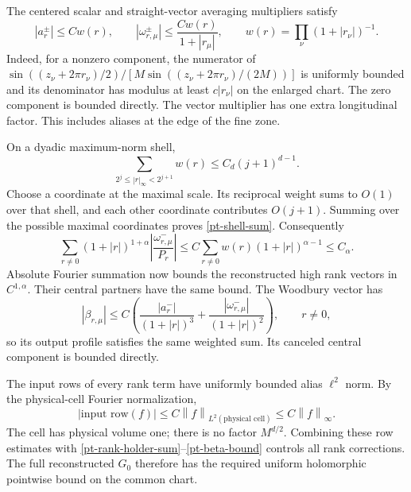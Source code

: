 \documentclass[11pt]{article}
\theoremstyle{remark}
\newcommand{\norm}[1]{\left\|#1\right\|}
\begin{document}
The centered scalar and straight-vector averaging multipliers satisfy
\begin{equation}\label{pt-alias-weights}
 |a_r^\pm|\le Cw(r),\qquad
 |\omega_{r,\mu}^\pm|\le\frac{Cw(r)}{1+|r_\mu|},\qquad
 w(r)=\prod_\nu(1+|r_\nu|)^{-1}.
\end{equation}
Indeed, for a nonzero component, the numerator of
$\sin((z_\nu+2\pi r_\nu)/2)/
 [M\sin((z_\nu+2\pi r_\nu)/(2M))]$
is uniformly bounded and its denominator has modulus at least
$c|r_\nu|$ on the enlarged chart. The zero component is bounded
directly. The vector multiplier has one extra longitudinal factor.
This includes aliases at the edge of the fine zone.

On a dyadic maximum-norm shell,
\begin{equation}\label{pt-shell-sum}
 \sum_{2^j\le|r|_\infty<2^{j+1}}w(r)
                      \le C_d(j+1)^{d-1}.
\end{equation}
Choose a coordinate at the maximal scale. Its reciprocal weight sums
to $O(1)$ over that shell, and each other coordinate contributes
$O(j+1)$. Summing over the possible maximal coordinates proves
\eqref{pt-shell-sum}. Consequently
\begin{equation}\label{pt-rank-holder-sum}
 \sum_{r\ne0}(1+|r|)^{1+\alpha}
             \left|\frac{\omega_{r,\mu}^-}{P_r}\right|
   \le C\sum_{r\ne0}w(r)(1+|r|)^{\alpha-1}
   \le C_\alpha.
\end{equation}
Absolute Fourier summation now bounds the reconstructed high rank
vectors in $C^{1,\alpha}$. Their central partners have the same bound.
The Woodbury vector has
\begin{equation}\label{pt-beta-bound}
 |\beta_{r,\mu}|
  \le C\left(\frac{|a_r^-|}{(1+|r|)^3}
                  +\frac{|\omega_{r,\mu}^-|}{(1+|r|)^2}\right),
       \qquad r\ne0,
\end{equation}
so its output profile satisfies the same weighted sum. Its canceled
central component is bounded directly.

The input rows of every rank term have uniformly bounded alias
$\ell^2$ norm. By the physical-cell Fourier normalization,
\[
 |\text{input row}(f)|
       \le C\norm{f}_{L^2(\text{physical cell})}
       \le C\norm{f}_\infty.
\]
The cell has physical volume one; there is no factor $M^{d/2}$.
Combining these row estimates with
\eqref{pt-rank-holder-sum}--\eqref{pt-beta-bound} controls all rank
corrections. The full reconstructed $G_0$ therefore has the required
uniform holomorphic pointwise bound on the common chart.
\end{document}
